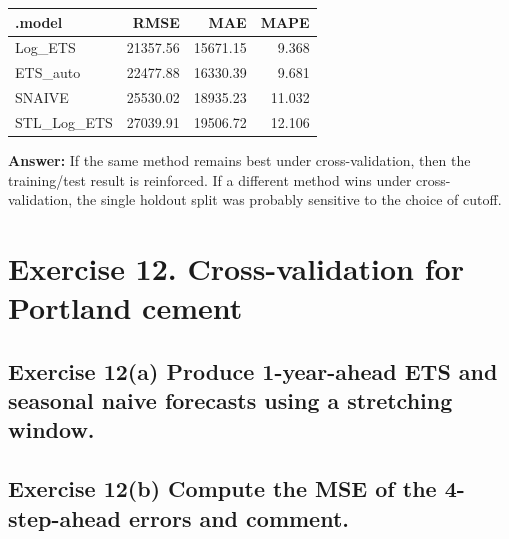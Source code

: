 \documentclass[
  11pt,
]{article}
\newcounter{none} %
\begin{document}
{\def\LTcaptype{none} %
\begin{longtable}[]{@{}lrrr@{}}
\toprule\noalign{}
.model & RMSE & MAE & MAPE \\
\midrule\noalign{}
\endhead
\bottomrule\noalign{}
\endlastfoot
Log\_ETS & 21357.56 & 15671.15 & 9.368 \\
ETS\_auto & 22477.88 & 16330.39 & 9.681 \\
SNAIVE & 25530.02 & 18935.23 & 11.032 \\
STL\_Log\_ETS & 27039.91 & 19506.72 & 12.106 \\
\end{longtable}
}

\textbf{Answer:} If the same method remains best under cross-validation,
then the training/test result is reinforced. If a different method wins
under cross-validation, the single holdout split was probably sensitive
to the choice of cutoff.

\section{Exercise 12. Cross-validation for Portland
cement}\label{exercise-12.-cross-validation-for-portland-cement}

\subsection{Exercise 12(a) Produce 1-year-ahead ETS and seasonal naive
forecasts using a stretching
window.}\label{exercise-12a-produce-1-year-ahead-ets-and-seasonal-naive-forecasts-using-a-stretching-window.}

\subsection{Exercise 12(b) Compute the MSE of the 4-step-ahead errors
and
comment.}\label{exercise-12b-compute-the-mse-of-the-4-step-ahead-errors-and-comment.}
\end{document}
